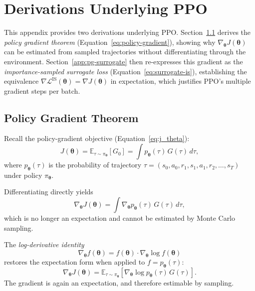 \chapter{Derivations Underlying PPO}
\label{app:derivation}

This appendix provides two derivations underlying PPO. Section~\ref{app:pg-derivation} derives the \emph{policy gradient theorem} (Equation~\ref{eq:policy-gradient}), showing why $\nabla_{\boldsymbol{\theta}} J(\boldsymbol{\theta})$ can be estimated from sampled trajectories without differentiating through the environment. Section~\ref{app:pg-surrogate} then re-expresses this gradient as the \emph{importance-sampled surrogate loss} (Equation~\ref{eq:surrogate-is}), establishing the equivalence $\nabla \mathcal{L}^{\text{IS}}(\boldsymbol{\theta}) = \nabla J(\boldsymbol{\theta})$ in expectation, which justifies PPO's multiple gradient steps per batch.

\section{Policy Gradient Theorem}
\label{app:pg-derivation}

Recall the policy-gradient objective 
(Equation~\ref{eq:j_theta}):
\begin{equation}
J(\boldsymbol{\theta}) 
= \mathbb{E}_{\tau \sim \pi_{\boldsymbol{\theta}}}[G_0] 
= \int p_{\boldsymbol{\theta}}(\tau) \, G(\tau) \, d\tau,
\label{eq:J}
\end{equation}
where $p_{\boldsymbol{\theta}}(\tau)$ is the probability of trajectory $\tau = (s_0, a_0, r_1, s_1, a_1, r_2, \ldots, s_T)$ under policy $\pi_{\boldsymbol{\theta}}$.

Differentiating directly yields
\begin{equation}
\nabla_{\boldsymbol{\theta}} J(\boldsymbol{\theta}) = \int 
\nabla_{\boldsymbol{\theta}} p_{\boldsymbol{\theta}}(\tau) \, G(\tau) \, d\tau,
\end{equation}
which is no longer an expectation and cannot be estimated by Monte Carlo sampling.

The \emph{log-derivative identity}
\begin{equation}
\nabla_{\boldsymbol{\theta}} f(\boldsymbol{\theta}) 
= f(\boldsymbol{\theta}) \cdot \nabla_{\boldsymbol{\theta}} \log f(\boldsymbol{\theta})
\end{equation}
restores the expectation form when applied to $f = p_{\boldsymbol{\theta}}(\tau)$:
\begin{equation}
\nabla_{\boldsymbol{\theta}} J(\boldsymbol{\theta}) 
= \mathbb{E}_{\tau \sim \pi_{\boldsymbol{\theta}}} 
\left[ \nabla_{\boldsymbol{\theta}} \log p_{\boldsymbol{\theta}}(\tau) \, G(\tau) \right].
\label{eq:expect_J}
\end{equation}
The gradient is again an expectation, and therefore estimable by sampling.

